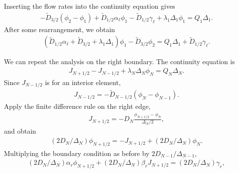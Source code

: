 Inserting the flow rates into the continuity equation gives
\begin{align}
  -\widetilde{D}_{3/2} ( \phi_2 - \phi_1 ) + \widetilde{D}_{1/2} \alpha_\ell \phi_1 - \widetilde{D}_{1/2} \gamma_\ell + \lambda_1 \Delta_1 \phi_1 = Q_1 \Delta_1 .
\end{align}
After some rearrangement, we obtain
\begin{align}
  \left( \widetilde{D}_{1/2} \alpha_\ell + \widetilde{D}_{3/2} + \lambda_1 \Delta_1 \right) \phi_1 - \widetilde{D}_{3/2} \phi_2 = Q_1 \Delta_1 + \widetilde{D}_{1/2} \gamma_\ell .
\end{align}

We can repeat the analysis on the right boundary. The continuity equation is
\begin{align}
  J_{N+1/2} - J_{N-1/2} + \lambda_{N} \Delta_{N} \phi_{N} = Q_{N} \Delta_{N} .
\end{align}
Since $J_{N-1/2}$ is for an interior element,
\begin{align}
  J_{N-1/2} = -\widetilde{D}_{N-1/2} ( \phi_{N} - \phi_{N-1} ) .
\end{align}
Apply the finite difference rule on the right edge,
\begin{align}
  J_{N+1/2} = -D_{N} \frac{ \phi_{N+1/2} - \phi_{N} }{ \Delta_{N} / 2 } ,
\end{align}
and obtain
\begin{align}
  ( 2 D_{N} / \Delta_{N} ) \phi_{N+1/2} = -J_{N+1/2} + ( 2 D_{N} / \Delta_{N} ) \phi_{N} .
\end{align}
Multiplying the boundary condition as before by $2 D_{N-1} / \Delta_{N-1}$,
\begin{align}
  ( 2 D_{N} / \Delta_{N} ) \alpha_r \phi_{N+1/2} + ( 2 D_{N} / \Delta_{N} ) \beta_r J_{N+1/2} = ( 2 D_{N} / \Delta_{N} ) \gamma_r,
\end{align}
